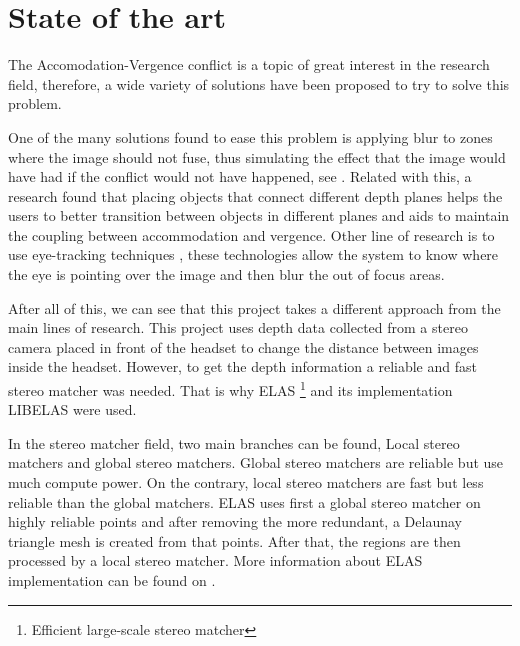 \documentclass[10pt,a4paper,twocolumn,twoside]{article}
\begin{document}
		
	\section{State of the art}
	The Accomodation-Vergence conflict is a topic of great interest in the research field, therefore, a wide variety of  solutions have been proposed to try to solve this problem. 
	
	One of the many solutions found to ease this problem is applying blur to zones where the image should not fuse, thus simulating the effect that the image would have had if the conflict would not have happened, see \cite{neareyeblur}. Related with this, a research \cite{sceneComposition} found that placing objects that connect different depth planes helps the users to better transition between objects in different planes and aids to maintain the coupling between accommodation and vergence. Other line of research is to use eye-tracking techniques \cite{eyeTracking}, these technologies allow the system to know where the eye is pointing over the image and then blur the out of focus areas. 
	
	After all of this, we can see that this project takes a different approach from the main lines of research.  This project uses depth data collected from a stereo camera placed in front of the headset to change the distance between images inside the headset. However, to get the depth information a reliable and fast stereo matcher was needed. That is why ELAS \footnote{Efficient large-scale stereo matcher} \cite{LIBELAS} and its implementation LIBELAS were used.  
		
	In the stereo matcher field, two main branches can be found, Local stereo matchers and global stereo matchers. Global stereo matchers are reliable but use much compute power. On the contrary, local stereo matchers are fast but less reliable than the global matchers. ELAS uses first a global stereo matcher on highly reliable points and after removing the more redundant, a Delaunay triangle mesh is created from that points. After that, the regions are then processed by a local stereo matcher. More information about ELAS implementation can be found on \cite{LIBELAS}. 
	
\end{document}
